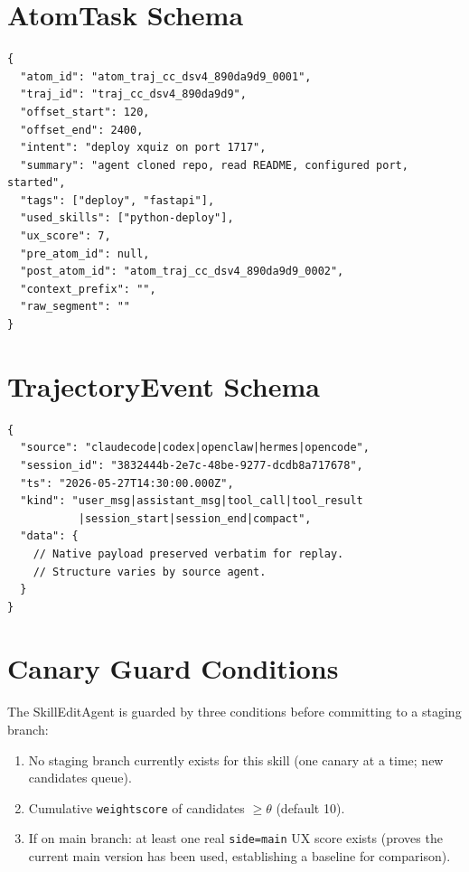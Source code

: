 \documentclass{article}
\begin{document}
\section{AtomTask Schema}
\label{app:atomtask}

\begin{verbatim}
{
  "atom_id": "atom_traj_cc_dsv4_890da9d9_0001",
  "traj_id": "traj_cc_dsv4_890da9d9",
  "offset_start": 120,
  "offset_end": 2400,
  "intent": "deploy xquiz on port 1717",
  "summary": "agent cloned repo, read README, configured port, started",
  "tags": ["deploy", "fastapi"],
  "used_skills": ["python-deploy"],
  "ux_score": 7,
  "pre_atom_id": null,
  "post_atom_id": "atom_traj_cc_dsv4_890da9d9_0002",
  "context_prefix": "",
  "raw_segment": ""
}
\end{verbatim}

\section{TrajectoryEvent Schema}
\label{app:trajevent}

\begin{verbatim}
{
  "source": "claudecode|codex|openclaw|hermes|opencode",
  "session_id": "3832444b-2e7c-48be-9277-dcdb8a717678",
  "ts": "2026-05-27T14:30:00.000Z",
  "kind": "user_msg|assistant_msg|tool_call|tool_result
           |session_start|session_end|compact",
  "data": {
    // Native payload preserved verbatim for replay.
    // Structure varies by source agent.
  }
}
\end{verbatim}

\section{Canary Guard Conditions}
\label{app:canary-guards}

The SkillEditAgent is guarded by three conditions before committing to a staging branch:
\begin{enumerate}
    \item No staging branch currently exists for this skill (one canary at a time; new candidates queue).
    \item Cumulative \texttt{weightscore} of candidates $\geq \theta$ (default 10).
    \item If on main branch: at least one real \texttt{side=main} UX score exists (proves the current main version has been used, establishing a baseline for comparison).
\end{enumerate}
\end{document}
